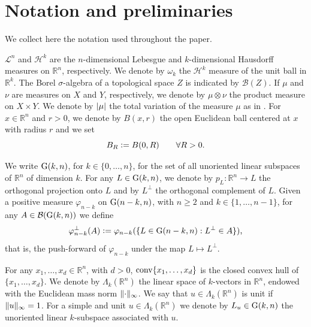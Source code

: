 \documentclass{article}
\numberwithin{equation}{section}
\theoremstyle{plain}%
\theoremstyle{definition}
\theoremstyle{definition}
\newcommand{\rgrande}{\mathbb{R}}
\newcommand{\haus}{\mathcal{H}}
\newcommand{\leb}{\mathcal{L}}
\newcommand{\conv}{{\rm conv}}
\newcommand{\grass}{{\rm G}}
\newcommand{\grasskn}{\grass(k,n)}
\newcommand{\grassnmenokn}{\grass(n-k,n)}
\newcommand{\boreliani}{\mathcal{B}}
\newcommand{\vettgen}[2]{\Lambda_{#1}(\rgrande^{#2})}
\DeclarePairedDelimiter{\norma}{\lVert}{\rVert} %
\DeclarePairedDelimiter{\valass}{\lvert}{\rvert} %
\begin{document}
\section{Notation and preliminaries}\label{sec:notation}
We collect here the notation used throughout the paper.

$\leb^n$ and $\haus^k$ are the $n$-dimensional Lebesgue and $k$-dimensional Hausdorff measures on $\rgrande^n$, respectively. We denote by $\omega_k$ the $\haus^k$ measure of the unit ball in $\rgrande^k$. The Borel $\sigma$-algebra of a topological space $Z$ is indicated by $\boreliani(Z)$. If $\mu$ and $\nu$ are measures on $X$ and $Y$, respectively, we denote by $\mu \otimes \nu$ the product measure on $X \times Y$. We denote by $\valass{\mu}$ the total variation of the measure $\mu$ as in \cite[Def. 1.4]{MR1857292}. For $x\in \rgrande^n$ and $r>0$, we denote by $B(x,r)$ the open Euclidean ball centered at $x$ with radius $r$ and we set
$$
B_R \vcentcolon= B(0,R)
\qquad \forall R>0.
$$

We write $\grasskn$, for $k \in \{0, \ldots, n \}$, for the set of all unoriented linear subspaces of $\rgrande^n$ of dimension $k$. For any $L \in \grasskn$, we denote by $p_L : \rgrande^n \to L$ the orthogonal projection onto $L$ and by $L^{\perp}$ the orthogonal complement of $L$. Given a positive measure $\varphi_{n-k}$ on $\grassnmenokn$, with $n \geq 2$ and $k \in \{ 1, \ldots, n-1 \}$, for any $A \in \boreliani(\grasskn)$ we define
$$
\varphi_{n-k}^{\perp} (A) \vcentcolon = \varphi_{n-k} ( \{ L \in \grassnmenokn : L^{\perp} \in A \} )
\text{,}
$$
that is, the push-forward of $\varphi_{n-k}$ under the map $L \mapsto L^{\perp}$.

For any $x_1, \ldots, x_d \in \rgrande^n$, with $d >0$, $\conv \{ x_1, \ldots, x_d\}$ is the closed convex hull of $\{ x_1, \ldots, x_d\}$. We denote by $\Lambda_{k}(\rgrande^n)$ the linear space of $k$-vectors in $\rgrande^n$, endowed with the Euclidean mass norm $\norma{\cdot}_{\infty}$. We say that $u \in \vettgen{k}{n}$ is unit if $\norma{u}_{\infty}=1$. For a simple and unit $u \in \vettgen{k}{n}$ we denote by $L_{u} \in \grasskn$ the unoriented linear $k$-subspace associated with $u$.
\end{document}
